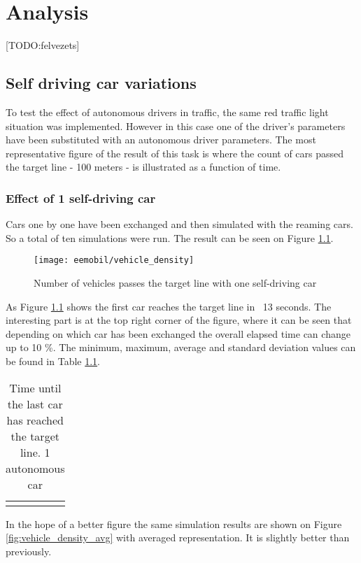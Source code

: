 \chapter{Analysis}
	[TODO:felvezets]
	\section{Self driving car variations}
		To test the effect of autonomous drivers in traffic, the same red traffic light situation was implemented. However in this case one of the driver's parameters have been substituted with an autonomous driver parameters. The most representative figure of the result of this task is where the count of cars passed the target line - 100 meters - is illustrated as a function of time. 
		\subsection{Effect of 1 self-driving car}
		Cars one by one have been exchanged and then simulated with the reaming cars. So a total of ten simulations were run. The result can be seen on Figure \ref{fig:vehicle_density}.
		\begin{figure}[ht]
			\centering
			\texttt{[image: eemobil/vehicle\_density]}
			\caption{Number of vehicles passes the target line with one self-driving car}
			\label{fig:vehicle_density}
		\end{figure}

		As Figure \ref{fig:vehicle_density} shows the first car reaches the target line in ~13 seconds. The interesting part is at the top right corner of the figure, where it can be seen that depending on which car has been exchanged the overall elapsed time can change up to 10 \%. The minimum, maximum, average and standard deviation values can be found in Table \ref{tab:vehicle_density_minmaxavg_case1}.
		\begin{table}[ht]
			\begin{center}
				\begin{tabular}{ |c|c|c|c|}
					\hline
					\vehicledensitytable{1}
					\hline
				\end{tabular}
			\end{center}
			\caption{Time until the last car has reached the target line. 1 autonomous car}
			\label{tab:vehicle_density_minmaxavg_case1}
		\end{table}
		
		In the hope of a better figure the same simulation results are shown on Figure \ref{fig:vehicle_density_avg} with averaged representation. It is slightly better than previously.
		

